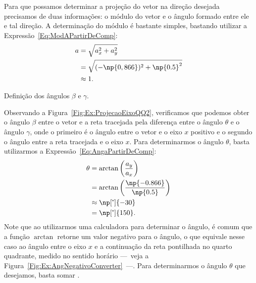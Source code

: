 Para que possamos determinar a projeção do vetor na direção desejada precisamos de duas informações: o módulo do vetor e o ângulo formado entre ele e tal direção. A determinação do módulo é bastante simples, bastando utilizar a Expressão~\eqref{Eq:ModAPartirDeComp}:
\begin{align}
    a &= \sqrt{a_x^2 + a_y^2} \\
    &= \sqrt{(-\np{0,866})^2 + \np{0.5}^2} \\
    &\approx 1.
\end{align}

\begin{marginfigure}[2cm]
\centering
{}
\caption{Definição dos ângulos $\beta$ e $\gamma$.\label{Fig:Ex:ProjecaoEixoQQ2}}
\end{marginfigure}

Observando a Figura~\ref{Fig:Ex:ProjecaoEixoQQ2}, verificamos que podemos obter o ângulo $\beta$ entre o vetor e a reta tracejada pela diferença entre o ângulo $\theta$ e o ângulo $\gamma$, onde o primeiro é o ângulo entre o vetor e o eixo $x$ positivo e o segundo o ângulo entre a reta tracejada e o eixo $x$. Para determinarmos o ângulo $\theta$, basta utilizarmos a Expressão~\eqref{Eq:AngaPartirDeComp}:
\begin{align}
    \theta &= \arctan \left(\frac{a_y}{a_x}\right) \\
    &= \arctan \left(\frac{\np{-0.866}}{\np{0.5}}\right) \\
    &\approx \np[\tcdegree]{-30} \\
    &= \np[\tcdegree]{150}.
\end{align}
%
Note que ao utilizarmos uma calculadora para determinar o ângulo, é comum que a função $\arctan$ retorne um valor negativo para o ângulo, o que equivale nesse caso ao ângulo entre o eixo $x$ e a continuação da reta pontilhada no quarto quadrante, medido no sentido horário ---~veja a Figura~\ref{Fig:Ex:AngNegativoConverter}~---. Para determinarmos o ângulo $\theta$ que desejamos, basta somar .

